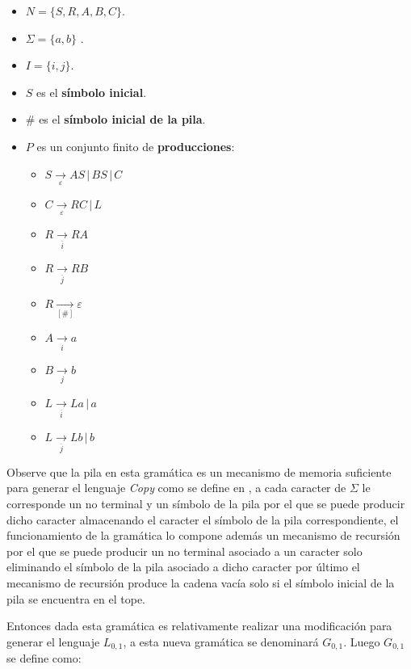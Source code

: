 \documentclass{article}
\begin{document}
\begin{itemize}
    \item $N= \{S,R,A,B,C\}$.
    \item \( \Sigma=\{a,b\} \) .
    \item $I=\{i,j\}$.
    \item $S$ es el \textbf{símbolo inicial}.
    \item $\#$ es el \textbf{símbolo inicial de la pila}.
    \item $P$ es un conjunto finito de \textbf{producciones}:
          \begin{multicols}{2}
              \begin{itemize}
                  \item $S\underset{\varepsilon}{\to} AS\,|\,BS\,|\,C$
                  \item $C\underset{\varepsilon}{\to} RC\,|\,L$
                  \item $R\underset{\overline{i}}{\to} RA$
                  \item $R\underset{\overline{j}}{\to} RB$
                  \item $R\underset{[\#]}{\to} \varepsilon$
                  \item $A\underset{i}{\to} a$
                  \item $B\underset{j}{\to} b$
                  \item $L\underset{\overline{i}}{\to} La\,|\,a$
                  \item $L\underset{\overline{j}}{\to} Lb\,|\,b$
              \end{itemize}
          \end{multicols}
\end{itemize}

Observe que la pila en esta gramática es un mecanismo de memoria suficiente para generar el lenguaje \textit{Copy} como se
define en \cite{globalIndexLanguages}, a cada caracter de $\Sigma$ le corresponde un no terminal y un símbolo de la pila 
por el que se puede producir dicho caracter almacenando el caracter el símbolo de la pila correspondiente, el funcionamiento 
de la gramática lo compone además un mecanismo de recursión por el que se puede producir un no terminal asociado a un caracter
solo eliminando el símbolo de la pila asociado a dicho caracter por último el mecanismo de recursión produce la cadena vacía
solo si el símbolo inicial de la pila se encuentra en el tope.

Entonces dada esta gramática es relativamente realizar una modificación para generar el lenguaje $L_{0,1}$,
a esta nueva gramática se denominará $G_{0,1}$. Luego $G_{0,1}$ se define como:
\end{document}
